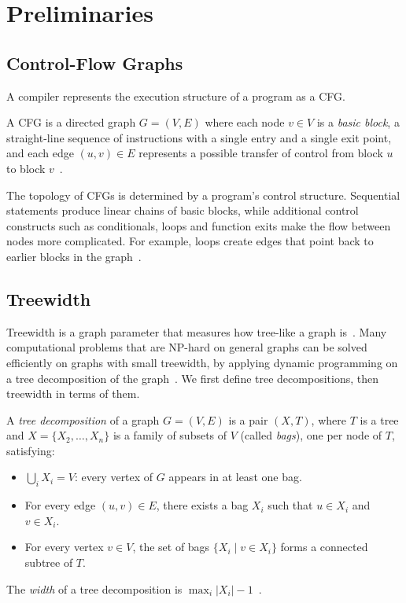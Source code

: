 \section{Preliminaries}
\label{sec:background}

\subsection{Control-Flow Graphs}
\label{subsec:cfg}

A compiler represents the execution structure of a program as a CFG.

\begin{definition}
A CFG is a directed graph $G = (V, E)$ where each node $v \in V$ is a \emph{basic block}, a straight-line sequence of instructions with a single entry and a single exit point, and each edge $(u, v) \in E$ represents a possible transfer of control from block $u$ to block $v$~\cite{allen_1970}.
\end{definition}

\noindent The topology of CFGs is determined by a program's control structure.
Sequential statements produce linear chains of basic blocks, while additional control constructs such as conditionals, loops and function exits make the flow between nodes more complicated.
For example, loops create edges that point back to earlier blocks in the graph~\cite[Ch.~7]{muchnick_1997}.

\subsection{Treewidth}
\label{subsec:treewidth}

Treewidth is a graph parameter that measures how tree-like a graph is~\cite{bodlaender_1993}.
Many computational problems that are NP-hard on general graphs can be solved efficiently on graphs with small treewidth, by applying dynamic programming on a tree decomposition of the graph~\cite{bodlaender_1988}.
We first define tree decompositions, then treewidth in terms of them.

\begin{definition}
A \emph{tree decomposition} of a graph $G = (V, E)$ is a pair $(X, T)$, where $T$ is a tree and $X = \{X_2, \ldots, X_n\}$ is a family of subsets of $V$ (called \emph{bags}), one per node of $T$, satisfying:
\begin{itemize}
	\item $\bigcup_{i} X_i = V$: every vertex of $G$ appears in at least one bag.
	\item For every edge $(u, v) \in E$, there exists a bag $X_i$ such that $u \in X_i$ and $v \in X_i$.
	\item For every vertex $v \in V$, the set of bags $\{X_i \mid v \in X_i\}$ forms a connected subtree of $T$.
\end{itemize}
The \emph{width} of a tree decomposition is $\max_i |X_i| - 1$~\cite{robertson_1986}.
\end{definition}


